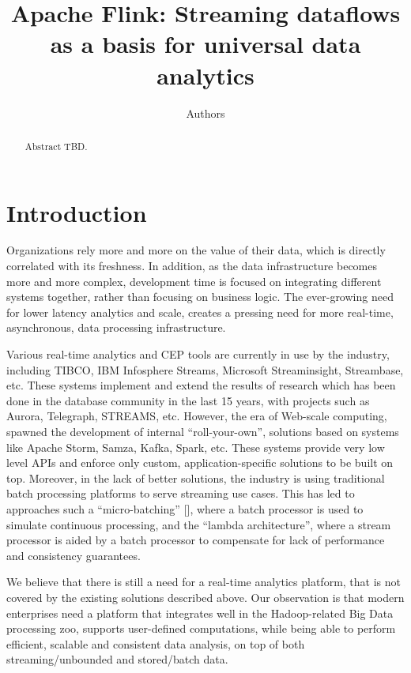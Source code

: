 \documentclass{sig-alternate}
\begin{document}
\title{Apache Flink\texttrademark : Streaming dataflows as a basis for universal data analytics}
\author{Authors}

\maketitle

\begin{abstract}
Abstract TBD.
\end{abstract}


\section{Introduction}

Organizations rely more and more on the value of their data, which is directly correlated with its freshness. In addition, as the data infrastructure becomes more and more complex, development time is focused on integrating different systems together, rather than focusing on business logic. The ever-growing need for lower latency analytics and scale, creates a pressing need for more real-time, asynchronous, data processing infrastructure.

Various real-time analytics and CEP tools are currently in use by the industry, including TIBCO, IBM Infosphere Streams, Microsoft Streaminsight, Streambase, etc. These systems implement and extend the results of research which has been done in the database community in the last 15 years, with projects such as Aurora, Telegraph, STREAMS, etc. However, the era of Web-scale computing, spawned the development of internal ``roll-your-own'', solutions based on systems like Apache Storm, Samza, Kafka, Spark, etc. These systems provide very low level APIs and enforce only custom, application-specific solutions to be built on top.  Moreover, in the lack of better solutions, the industry is using traditional batch processing platforms to serve streaming use cases. This has led to approaches such a ``micro-batching'' [], where a batch processor is used to simulate continuous processing, and the ``lambda architecture'', where a stream processor is aided by a batch processor to compensate for lack of performance and consistency guarantees.

We believe that there is still a need for a real-time analytics platform, that is not covered by the existing solutions described above. Our observation is that modern enterprises need a platform that integrates well in the Hadoop-related Big Data processing zoo, supports user-defined computations, while being able to perform efficient, scalable and consistent data analysis, on top of both streaming/unbounded and stored/batch data.
\end{document}
